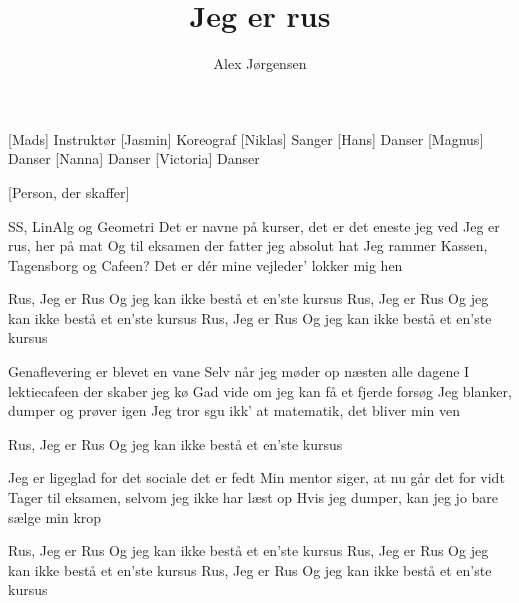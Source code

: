 \documentclass[a4paper,11pt]{article}
\title{Jeg er rus}
\author{Alex Jørgensen}
\begin{document}
\maketitle

\begin{roles}
[Mads] Instruktør
[Jasmin] Koreograf
[Niklas] Sanger
[Hans] Danser
[Magnus] Danser
[Nanna] Danser
[Victoria] Danser
\end{roles}

\begin{props}
[Person, der skaffer]
\end{props}


\begin{song}
%
SS, LinAlg og Geometri
Det er navne på kurser, det er det eneste jeg ved
Jeg er rus, her på mat
Og til eksamen der fatter jeg absolut hat
Jeg rammer Kassen, Tagensborg og Cafeen?
Det er dér mine vejleder' lokker mig hen

 Rus, Jeg er Rus
Og jeg kan ikke bestå et en'ste kursus
Rus, Jeg er Rus
Og jeg kan ikke bestå et en'ste kursus
Rus, Jeg er Rus
Og jeg kan ikke bestå et en'ste kursus

%
Genaflevering er blevet en vane
Selv når jeg møder op næsten alle dagene
I lektiecafeen der skaber jeg kø
Gad vide om jeg kan få et fjerde forsøg
Jeg blanker, dumper og prøver igen
Jeg tror sgu ikk' at matematik, det bliver min ven

%
Rus, Jeg er Rus
Og jeg kan ikke bestå et en'ste kursus

%
Jeg er ligeglad for det sociale det er fedt
Min mentor siger, at nu går det for vidt
Tager til eksamen, selvom jeg ikke har læst op
Hvis jeg dumper, kan jeg jo bare sælge min krop

%
Rus, Jeg er Rus
Og jeg kan ikke bestå et en'ste kursus
Rus, Jeg er Rus
Og jeg kan ikke bestå et en'ste kursus
Rus, Jeg er Rus
Og jeg kan ikke bestå et en'ste kursus
\end{song}
\end{document}
